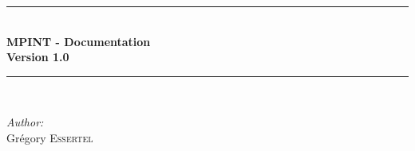 \documentclass[10pt,a4paper]{article}
\begin{document}
  
  \begin{titlepage}
    
    \newcommand{\HRule}{\rule{\linewidth}{0.5mm}} %
    
    \center %
    
    
    
    
    \HRule \\[0.5cm]
    { \huge \bfseries MPINT - Documentation \\ Version 1.0}\\[0.5cm] %
    \HRule \\[4cm]
    
    
    \begin{minipage}{0.4\textwidth}
      \begin{flushleft} \large
	\emph{Author:}\\
	Gr\'egory \textsc{Essertel}\\%
      \end{flushleft}
    \end{minipage}
    ~
    \begin{minipage}{0.4\textwidth}
      ~
    \end{minipage}\\[5cm]
    

\end{titlepage}
\end{document}
